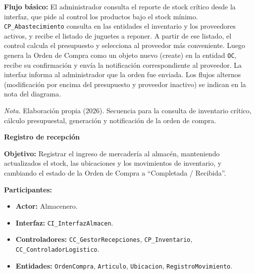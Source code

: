 \documentclass[12pt,a4paper]{article}
\begin{document}
\begin{landscape}
\begin{minipage}[t]{0.40\linewidth}
\medskip
\textbf{Flujo b\'asico:} El administrador consulta el reporte de stock cr\'itico desde la interfaz, que pide al control los productos bajo el stock m\'inimo. \texttt{CP\_Abastecimiento} consulta en las entidades el inventario y los proveedores activos, y recibe el listado de juguetes a reponer. A partir de ese listado, el control calcula el presupuesto y selecciona al proveedor m\'as conveniente. Luego genera la Orden de Compra como un objeto nuevo (\guillemotleft create\guillemotright) en la entidad \texttt{OC}, recibe su confirmaci\'on y env\'ia la notificaci\'on correspondiente al proveedor. La interfaz informa al administrador que la orden fue enviada. Los flujos alternos (modificaci\'on por encima del presupuesto y proveedor inactivo) se indican en la nota del diagrama.
\end{minipage}\hfill
\begin{minipage}[t]{0.58\linewidth}
\vspace{0pt}
\centering
{}
\label{fig:seq_cus03}
\resizebox{!}{0.46\textheight}{}
\par\vspace{0.5ex}
{\raggedright \small \emph{Nota.} Elaboraci\'on propia (2026). Secuencia para la consulta de inventario cr\'itico, c\'alculo presupuestal, generaci\'on y notificaci\'on de la orden de compra.\par}
\end{minipage}

\clearpage
\par\vspace{0.3cm}

\noindent\begin{minipage}[t]{0.38\linewidth}
\vspace{0pt}
\footnotesize \singlespacing \raggedright
\textbf{Registro de recepci\'on}

\smallskip
\textbf{Objetivo:} Registrar el ingreso de mercader\'ia al almac\'en, manteniendo actualizados el stock, las ubicaciones y los movimientos de inventario, y cambiando el estado de la Orden de Compra a ``Completada / Recibida''.

\smallskip
\textbf{Participantes:}
\begin{itemize}\setlength{\itemsep}{0pt}\setlength{\parskip}{0pt}\setlength{\parsep}{0pt}
  \item \textbf{Actor:} Almacenero.
  \item \textbf{Interfaz:} \texttt{CI\_InterfazAlmacen}.
  \item \textbf{Controladores:} \texttt{CC\_GestorRecepciones}, \texttt{CP\_Inventario}, \texttt{CC\_ControladorLogistico}.
  \item \textbf{Entidades:} \texttt{OrdenCompra}, \texttt{Articulo}, \texttt{Ubicacion}, \texttt{RegistroMovimiento}.
\end{itemize}


\end{minipage}
\end{landscape}
\end{document}
